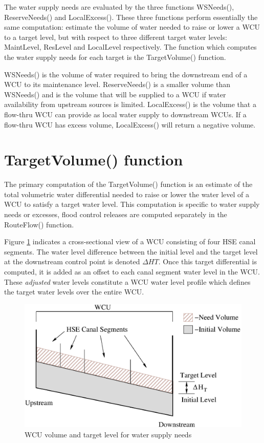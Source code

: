The water supply needs are evaluated by the three functions WSNeeds(),
ReserveNeeds() and LocalExcess(). These three functions perform
essentially the same computation: estimate the volume of water needed
to raise or lower a WCU to a target level, but with respect to three
different target water levels: MaintLevel, ResLevel and LocalLevel
respectively. The function which computes the water supply needs for
each target is the TargetVolume() function.

WSNeeds() is the volume of water required to bring the downstream end
of a WCU to its maintenance level. ReserveNeeds() is a smaller volume
than WSNeeds() and is the volume that will be supplied to a WCU if
water availability from upstream sources is limited. LocalExcess() is
the volume that a flow-thru WCU can provide as local water supply to
downstream WCUs. If a flow-thru WCU has excess volume, LocalExcess()
will return a negative volume.

\section {TargetVolume() function}

The primary computation of the TargetVolume() function is an estimate
of the total volumetric water differential needed to raise or lower
the water level of a WCU to satisfy a target water level. This
computation is specific to water supply needs or excesses, flood
control releases are computed separately in the RouteFlow() function.

Figure \ref{fig:WCUvolumeTarget} indicates a cross-sectional view of a
WCU consisting of four HSE canal segments. The water level difference
between the initial level and the target level at the downstream
control point is denoted $\Delta HT$. Once this target differential is
computed, it is added as an offset to each canal segment water level
in the WCU. These \emph{adjusted} water levels constitute a WCU water
level profile which defines the target water levels over the entire
WCU.

\begin{figure}
 \begin{center}
  \includegraphics[scale=.5]{Graphics/WCUvolumeTarget.eps}
 \end{center}
 \caption{\label{fig:WCUvolumeTarget} WCU volume and target level for
   water supply needs}
\end{figure}

